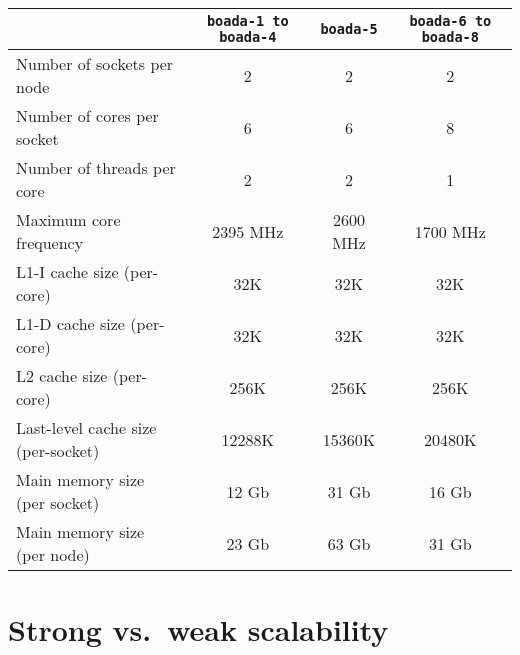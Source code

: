 \begin{table}[htpb]%
    \label{tab:node_arch_and_mem}
    \centering
    \begin{tabular}{lccc}

    \toprule
        & \texttt{boada-1 to boada-4} & \texttt{boada-5} & \texttt{boada-6 to boada-8} \\
    \midrule
        Number of sockets per node          & 2        & 2        & 2        \\
        Number of cores per socket          & 6        & 6        & 8        \\
        Number of threads per core          & 2        & 2        & 1        \\
        Maximum core frequency              & 2395 MHz & 2600 MHz & 1700 MHz \\
    \addlinespace[1em]
        L1-I cache size (per-core)          & 32K      & 32K      & 32K      \\
        L1-D cache size (per-core)          & 32K      & 32K      & 32K      \\
        L2 cache size (per-core)            & 256K     & 256K     & 256K     \\
        Last-level cache size (per-socket)  & 12288K   & 15360K   & 20480K   \\
    \addlinespace[1em]
        Main memory size (per socket)       & 12 Gb    & 31 Gb    & 16 Gb    \\
        Main memory size (per node)         & 23 Gb    & 63 Gb    & 31 Gb    \\
    \bottomrule

    \end{tabular}
\end{table}


\section{Strong vs.\ weak scalability}%
\label{sec:strong_vs_weak_scalability}


